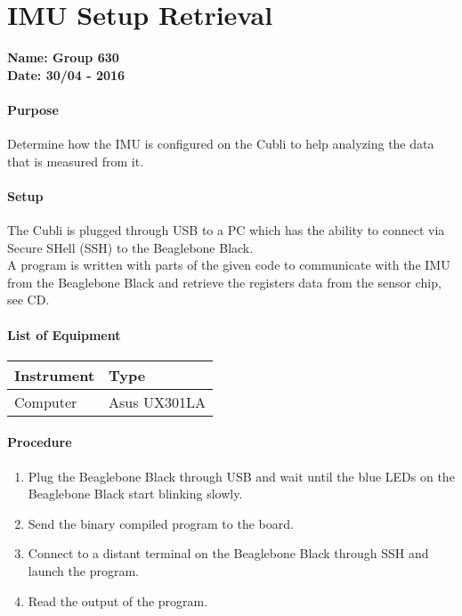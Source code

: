 \chapter{IMU Setup Retrieval} \label{app:IMUSetupRetrieval}
\textbf{Name: Group 630}\\
\textbf{Date: 30/04 - 2016}

\subsubsection{Purpose}
Determine how the IMU is configured on the Cubli to help analyzing the data that is measured from it.

\subsubsection{Setup}
The Cubli is plugged through USB to a PC which has the ability to connect via Secure SHell (SSH) to the Beaglebone Black.\\
A program is written with parts of the given code to communicate with the IMU from the Beaglebone Black and retrieve the registers data from the sensor chip, see CD.
                                                     
\subsubsection{List of Equipment}
\begin{table}[H]
\begin{tabular}{|p{10cm}|p{4cm}|}
\hline%
  \textbf{Instrument}                &  \textbf{Type} \\
\hline%
  Computer                           &  Asus UX301LA  \\
\hline%
\end{tabular}
\end{table}

\subsubsection{Procedure}

\begin{enumerate}
  \item Plug the Beaglebone Black through USB and wait until the blue LEDs on the Beaglebone Black start blinking slowly.
  \item Send the binary compiled program to the board.
  \item Connect to a distant terminal on the Beaglebone Black through SSH and launch the program.
  \item Read the output of the program.
\end{enumerate}
